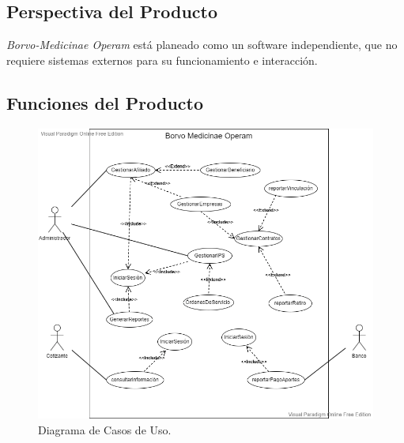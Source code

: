 \documentclass[12pt,a4paper]{article}
\begin{document}
\subsection{Perspectiva del Producto}
\emph{Borvo-Medicinae Operam} está planeado como un software independiente, que no requiere sistemas externos para su funcionamiento e interacción. 
\subsection{Funciones del Producto}
\vspace{5mm}
\begin{figure}[H]
\centering
{\includegraphics[width=1 \textwidth]{use_cases_diagram.png} \par}
\caption{Diagrama de Casos de Uso.}
\end{figure}
\end{document}
